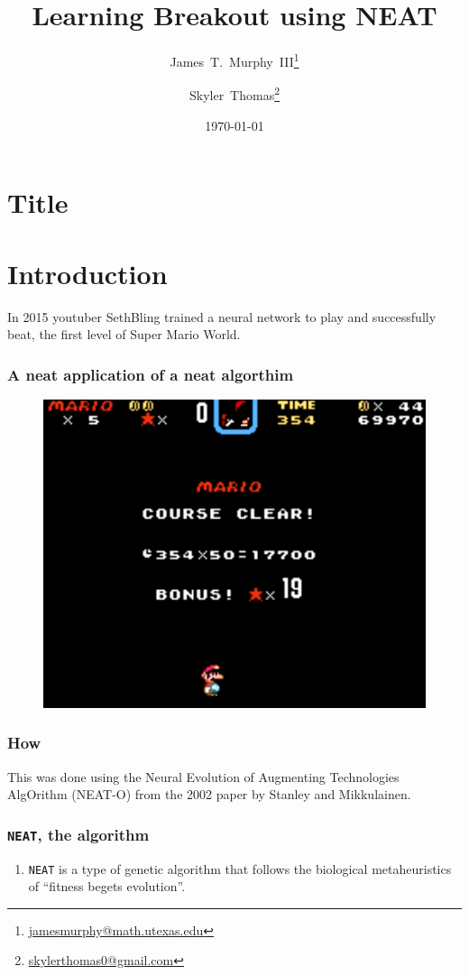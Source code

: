 \documentclass[t,pdflatex]{beamer}
\title{Learning Breakout using NEAT}
\author{James~T.~Murphy~III\thanks{\url{jamesmurphy@math.utexas.edu}}\and{}Skyler~Thomas\thanks{\url{skylerthomas0@gmail.com}}}
\institute{The University of Texas at Austin}
\date\today
\begin{document}
\section{Title}

    \begin{frame}

        \titlepage

    \end{frame}

\section{Introduction}
    \begin{frame}

        In 2015 youtuber SethBling trained a neural network to play and successfully beat, the first level of Super Mario World.
        \frametitle{A neat application of a neat algorthim}
        \begin{figure}
            \centering
            \includegraphics[width=.54 \textwidth]{mario.png}
        \end{figure}

    \end{frame}

    \begin{frame}

        \frametitle{How}
        This was done using the Neural Evolution of Augmenting Technologies AlgOrithm (NEAT-O) from the 2002 paper by Stanley and Mikkulainen.



    \end{frame}

    \begin{frame}

        \frametitle{\texttt{NEAT}, the algorithm}
        \begin{enumerate}[1]
            \item \texttt{NEAT} is a type of genetic algorithm that follows the biological metaheuristics of ``fitness begets evolution''.

        \end{enumerate}

    \end{frame}
\end{document}
